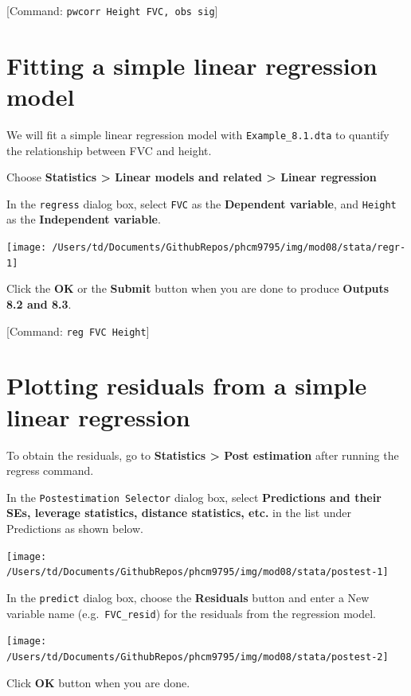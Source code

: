 \documentclass[
]{memoir}
\begin{document}
{[}Command: \texttt{pwcorr\ Height\ FVC,\ obs\ sig}{]}

\hypertarget{fitting-a-simple-linear-regression-model}{%
\section{Fitting a simple linear regression model}\label{fitting-a-simple-linear-regression-model}}

We will fit a simple linear regression model with \texttt{Example\_8.1.dta} to quantify the relationship between FVC and height.

Choose \textbf{Statistics \textgreater{} Linear models and related \textgreater{} Linear regression}

In the \texttt{regress} dialog box, select \texttt{FVC} as the \textbf{Dependent variable}, and \texttt{Height} as the \textbf{Independent variable}.

\texttt{[image: /Users/td/Documents/GithubRepos/phcm9795/img/mod08/stata/regr-1]}

Click the \textbf{OK} or the \textbf{Submit} button when you are done to produce \textbf{Outputs 8.2 and 8.3}.

{[}Command: \texttt{reg\ FVC\ Height}{]}

\hypertarget{plotting-residuals-from-a-simple-linear-regression}{%
\section{Plotting residuals from a simple linear regression}\label{plotting-residuals-from-a-simple-linear-regression}}

To obtain the residuals, go to \textbf{Statistics \textgreater{} Post estimation} after running the regress command.

In the \texttt{Postestimation\ Selector} dialog box, select \textbf{Predictions and their SEs, leverage statistics, distance statistics, etc.} in the list under Predictions as shown below.

\texttt{[image: /Users/td/Documents/GithubRepos/phcm9795/img/mod08/stata/postest-1]}

In the \texttt{predict} dialog box, choose the \textbf{Residuals} button and enter a New variable name (e.g.~\texttt{FVC\_resid}) for the residuals from the regression model.

\texttt{[image: /Users/td/Documents/GithubRepos/phcm9795/img/mod08/stata/postest-2]}

Click \textbf{OK} button when you are done.
\end{document}
